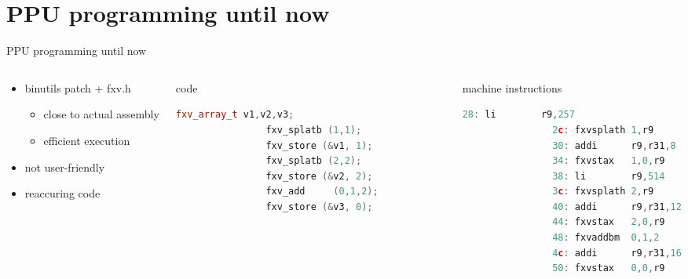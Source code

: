 \documentclass[10pt]{beamer}
\begin{document}
\section{PPU programming until now}
\begin{frame}[fragile]{PPU programming until now}
	\begin{columns}[t]
		\begin{column}{0.35\textwidth}
    		\begin{itemize}
				\item binutils patch + fxv.h
					\begin{itemize}
						\item close to actual assembly
						\item efficient execution
					\end{itemize}
				\item not user-friendly
				\item reaccuring code
			\end{itemize}    
    	\end{column}    
    	\begin{column}{0.27\textwidth}
     		\begin{block}{code}
        		\begin{lstlisting}[language=C++,basicstyle=\ttfamily\scriptsize,keywordstyle=\color{red}]
				fxv_array_t v1,v2,v3;
				fxv_splatb (1,1);
				fxv_store (&v1, 1);
				fxv_splatb (2,2);
				fxv_store (&v2, 2);
				fxv_add 	(0,1,2);
				fxv_store (&v3, 0);				
				\end{lstlisting}
      		\end{block}
    	\end{column}
    	\begin{column}{0.30\textwidth}
    		\begin{block}{machine instructions}
       			\begin{lstlisting}[language=C++,basicstyle=\ttfamily\scriptsize,keywordstyle=\color{red}]
				28: li        r9,257
				2c: fxvsplath 1,r9
				30: addi      r9,r31,8
				34: fxvstax   1,0,r9
				38: li        r9,514
				3c: fxvsplath 2,r9
				40: addi      r9,r31,12
				44: fxvstax   2,0,r9
				48: fxvaddbm  0,1,2
				4c: addi      r9,r31,16
				50: fxvstax   0,0,r9
			\end{lstlisting}
      		\end{block}
		\end{column}
	\end{columns}
\end{frame}
\end{document}
